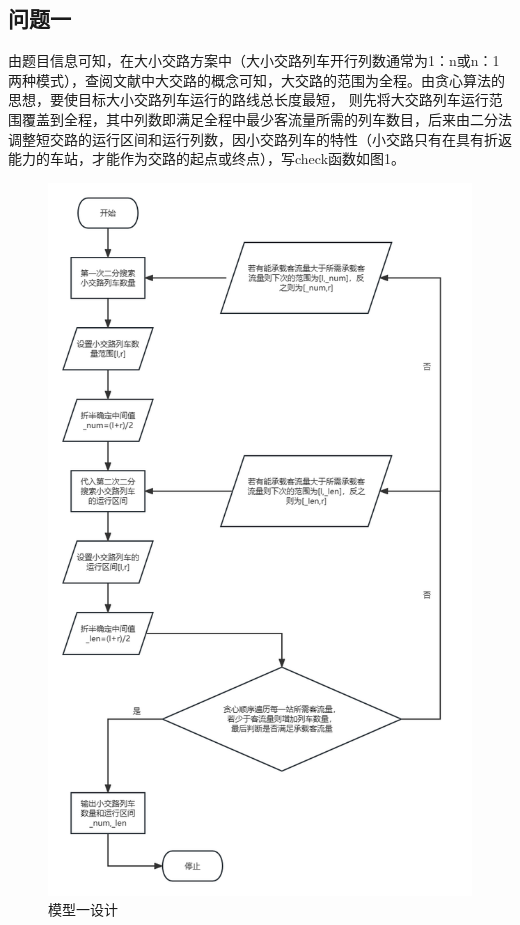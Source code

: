 \documentclass[UTF8]{ctexart}
\begin{document}
\subsection{问题一}
由题目信息可知，在大小交路方案中（大小交路列车开行列数通常为1：n或n：1两种模式），查阅文献中大交路的概念可知，大交路的范围为全程。由贪心算法的思想，要使目标大小交路列车运行的路线总长度最短， 则先将大交路列车运行范围覆盖到全程，其中列数即满足全程中最少客流量所需的列车数目，后来由二分法调整短交路的运行区间和运行列数，因小交路列车的特性（小交路只有在具有折返能力的车站，才能作为交路的起点或终点），写check函数如图1。\par
\begin{figure}[h]
	\centering
	\includegraphics[scale=0.41]{模型一设计.png}
	\caption{模型一设计}
\end{figure}
\end{document}
